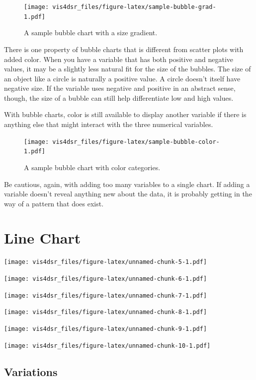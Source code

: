\documentclass[
]{krantz}
\begin{document}
\begin{figure}
\centering
\texttt{[image: vis4dsr\_files/figure-latex/sample-bubble-grad-1.pdf]}
\caption{\label{fig:sample-bubble-grad}A sample bubble chart with a size gradient.}
\end{figure}

There is one property of bubble charts that is different from scatter plots with
added color. When you have a variable that has both positive and negative values,
it may be a slightly less natural fit for the size of the bubbles. The size of an
object like a circle is naturally a positive value. A circle doesn't itself have
negative size. If the variable uses negative and positive in an abstract sense,
though, the size of a bubble can still help differentiate low and high values.

With bubble charts, color is still available to display another variable if there
is anything else that might interact with the three numerical variables.

\begin{figure}
\centering
\texttt{[image: vis4dsr\_files/figure-latex/sample-bubble-color-1.pdf]}
\caption{\label{fig:sample-bubble-color}A sample bubble chart with color categories.}
\end{figure}

Be cautious, again, with adding too many variables to a single chart. If adding
a variable doesn't reveal anything new about the data, it is probably getting in the
way of a pattern that does exist.

\hypertarget{line-chart}{%
\section{Line Chart}\label{line-chart}}

\texttt{[image: vis4dsr\_files/figure-latex/unnamed-chunk-5-1.pdf]}

\texttt{[image: vis4dsr\_files/figure-latex/unnamed-chunk-6-1.pdf]}

\texttt{[image: vis4dsr\_files/figure-latex/unnamed-chunk-7-1.pdf]}

\texttt{[image: vis4dsr\_files/figure-latex/unnamed-chunk-8-1.pdf]}

\texttt{[image: vis4dsr\_files/figure-latex/unnamed-chunk-9-1.pdf]}

\texttt{[image: vis4dsr\_files/figure-latex/unnamed-chunk-10-1.pdf]}

\hypertarget{variations-2}{%
\subsection{Variations}\label{variations-2}}
\end{document}
